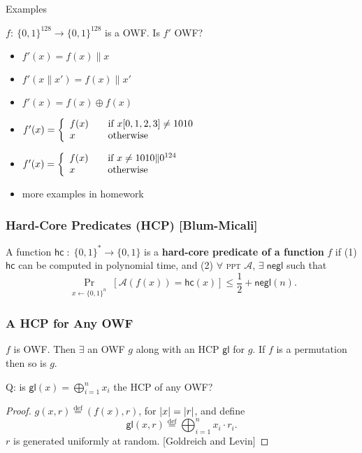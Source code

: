 \begin{frame}{Examples}
\begin{exampleblock}{$f:\ \{0,1\}^{128} \to \{0,1\}^{128}$ is a OWF. Is $f'$ OWF?}
\begin{itemize}
\item $f'(x) = f(x)\| x$
\item $f'(x\|x') = f(x)\|x'$
\item $f'(x) = f(x) \oplus f(x)$
\item $ f'(x) = \left\{ 
  \begin{array}{l l}
    f(x) & \quad \text{if $x[0,1,2,3] \neq 1010$}\\
    x & \quad \text{otherwise}\\
  \end{array} \right. $
\item $ f'(x) = \left\{ 
  \begin{array}{l l}
    f(x) & \quad \text{if $x \neq 1010\|0^{124}$}\\
    x & \quad \text{otherwise}\\
  \end{array} \right. $
\item more examples in homework
\end{itemize}
\end{exampleblock}
\end{frame}
\begin{frame}\frametitle{Hard-Core Predicates (HCP) [Blum-Micali]}
\begin{figure}
\begin{center}

\end{center}
\end{figure}
\begin{definition}
A function $\mathsf{hc}\; : \; \{0,1\}^* \to \{0,1\}$ is a \textbf{hard-core predicate of a function} $f$ if (1) $\mathsf{hc}$ can be computed in polynomial time, and (2) $\forall$ \textsc{ppt} $\mathcal{A}$, $\exists\; \mathsf{negl}$ such that
\[ \Pr_{\substack{x \gets \{0,1\}^n}}[\mathcal{A}(f(x)) = \mathsf{hc}(x)] \le \frac{1}{2} + \mathsf{negl}(n). \]
\end{definition}
\end{frame}
\begin{frame}\frametitle{A HCP for Any OWF}
\begin{theorem}
$f$ is OWF. Then $\exists$ an OWF $g$ along with an HCP $\mathsf{gl}$ for $g$. If $f$ is a permutation then so is $g$.
\end{theorem}
\begin{alertblock}{}
\alert{Q: is $\mathsf{gl}(x) = \bigoplus^{n}_{i=1} x_i$ the HCP of any OWF?}
\end{alertblock}
\begin{proof}
$g(x,r) \overset{\text{def}}{=} (f(x), r)$, for $\lvert x\rvert = \lvert r\rvert$, and define
\[ \mathsf{gl}(x,r) \overset{\text{def}}{=} \bigoplus^{n}_{i=1} x_i \cdot r_i. \]
$r$ is generated uniformly at random. [Goldreich and Levin]
\end{proof}
\end{frame}
